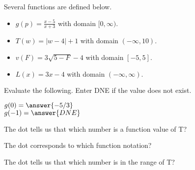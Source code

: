 \documentclass{ximera}
\begin{document}
\begin{definition}
Several functions are defined below.
\begin{itemize}
\item $g(p) = \frac{x-5}{x+3}$ with domain $[0, \infty)$. \\ \quad
\item $T(w) = | w - 4 | + 1$ with domain $(-\infty, 10)$. 
\item $v(F) = 3\sqrt{5 - F} - 4$ with domain $[-5, 5]$. 
\item $L(x) = 3x - 4$ with domain $(-\infty, \infty)$. 
\end{itemize}
\end{definition}



\begin{exercise}
Evaluate the following.  Enter DNE if the value does not exist.

$g(0) = \answer{-5/3}$  \\
$g(-1) = \answer{DNE}$


\end{exercise}






\begin{exercise}
The dot tells us that which number is a function value of T?

\begin{selectAll}
\end{selectAll}

\end{exercise}




\begin{exercise}
The dot corresponds to which function notation? 

\begin{selectAll}
\end{selectAll}

\end{exercise}





\begin{exercise}
The dot tells us that which number is in the range of T?

\begin{selectAll}
\end{selectAll}

\end{exercise}
\end{document}
